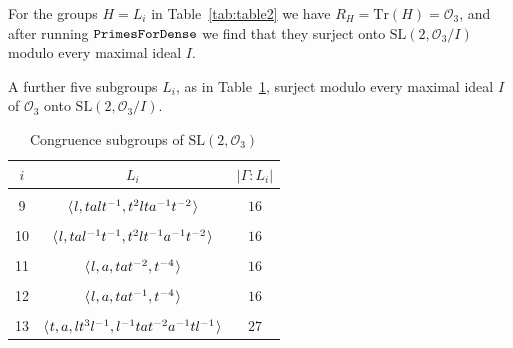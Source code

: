 \documentclass[11pt]{amsart}
\theoremstyle{definition}
\theoremstyle{remark}
\newcommand{\G}{{\Gamma}}
\newcommand{\SL}{\mathrm{SL}}
\begin{document}
\noindent For the groups $H = L_i$ in Table~\ref{tab:table2}
 we have $R_H=\mathrm{Tr}(H)=\mathcal{O}_3$, and after running
${\tt PrimesForDense}$ we find that they surject onto 
$\SL(2, \mathcal{O}_3/I)$ modulo every maximal ideal $I$. 

A further five subgroups $L_i$, as in Table~\ref{tab:table3}, 
surject modulo every maximal ideal $I$ of $\mathcal{O}_3$
onto $\SL(2,\mathcal{O}_3/I)$. 

\begin{table}[h!]
  \begin{center}
    \caption{Congruence subgroups of $\SL(2, \mathcal{O}_3)$}
    \label{tab:table3}
    \begin{tabular}{|c|c|c|}
      \hline
      $i$ & $L_i$ & $|\G : L_i|$ \\
      \hline
			\vspace{-12pt} & &  \\
9&$\langle \hspace{.75pt} l, talt^{-1}, t^{2}lta^{-1}t^{-2} 
 \hspace{.75pt} \rangle$&$16$\\
\vspace{-12pt} & &  \\
10&$\langle \hspace{.75pt} l, tal^{-1}t^{-1}, t^{2}lt^{-1}a^{-1}t^{-2}  
 \hspace{.75pt} \rangle$&$16$\\
\vspace{-12pt} & &  \\
11&$\langle \hspace{.75pt} l, a, tat^{-2}, t^{-4}  
 \hspace{.75pt} \rangle$&$16$\\
\vspace{-12pt} & &  \\
12&$\langle \hspace{.75pt} l, a, tat^{-1}, t^{-4}  
 \hspace{.75pt} \rangle$&$16$\\
\vspace{-12pt} & &  \\
13&$\langle \hspace{.75pt} t,a,lt^{3}l^{-1},l^{-1}tat^{-2}a^{-1}tl^{-1} 
 \hspace{.75pt} \rangle$&$27$\\
                \hline
    \end{tabular}
  \end{center}
\end{table}
\end{document}
